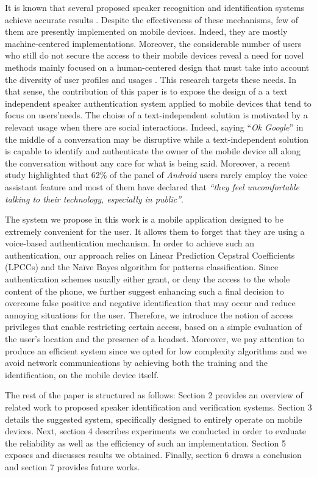 \documentclass[cryptography,article,submit,moreauthors,pdftex,10pt,a4paper]{mdpi}
\begin{document}
It is known that several proposed speaker recognition and identification systems achieve accurate results \cite{18,19,20}. Despite the effectiveness of these mechanisms, few of them are presently implemented on mobile devices. Indeed, they are mostly machine-centered implementations. Moreover, the considerable number of users who still do not secure the access to their mobile devices \cite{5} reveal a need for novel methods mainly focused on a human-centered design that must take into account the diversity of user profiles and usages \cite{21}. This research targets these needs. In that sense, the contribution of this paper is to expose the design of a a text independent speaker authentication system applied to mobile devices that tend to focus on users\textquoteright needs. The choise of a text-independent solution is motivated by a relevant usage when there are social interactions. Indeed, saying ``\textit{Ok Google}'' in the middle of a conversation may be disruptive while a text-independent solution is capable to identify and authenticate the owner of the mobile device all along the conversation without any care for what is being said. Moreover, a recent study \cite{36} highlighted that 62\% of the panel of \textit{Android} users rarely employ the voice assistant feature and most of them have declared that \textit{``they feel uncomfortable talking to their technology, especially in public''}.

The system we propose in this work is a mobile application designed to be extremely convenient for the user. It allows them to forget that they are using a voice-based authentication mechanism. In order to achieve such an authentication, our approach relies on Linear Prediction Cepstral Coefficients (LPCCs) and the Na\"ive Bayes algorithm for patterns classification. Since authentication schemes usually either grant, or deny the access to the whole content of the phone, we further suggest enhancing such a final decision to overcome false positive and negative identification that may occur and reduce annoying situations for the user. Therefore, we introduce the notion of access privileges that enable restricting certain access, based on a simple evaluation of the user\textquoteright s location and the presence of a headset. Moreover, we pay attention to produce an efficient system since we opted for low complexity algorithms and we avoid network communications by achieving both the training and the identification, on the mobile device itself.

The rest of the paper is structured as follows: Section 2 provides an overview of related work to proposed speaker identification and verification systems. Section 3 details the suggested system, specifically designed to entirely operate on mobile devices. Next, section 4 describes experiments we conducted in order to evaluate the reliability as well as the efficiency of such an implementation. Section 5 exposes and discusses results we obtained. Finally, section 6 draws a conclusion and section 7 provides future works.
 
\end{document}
